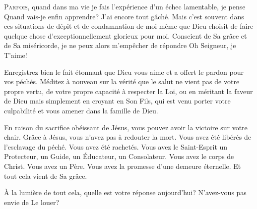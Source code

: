 



\lettrine{P}{arfois}, quand dans ma vie je fais l'expérience
 d'un échec lamentable, je pense\frcolon{} 
 \Og Quand vais-je enfin apprendre? J'ai encore tout gâché. \Fg{}
 Mais c'est souvent dans ces situations de dépit et de condamnation
 de moi-même que Dieu choisit de faire quelque chose d'exceptionnellement
 glorieux pour moi. Conscient de Sa grâce et de Sa miséricorde,
 je ne peux alors m'empêcher de répondre\frcolon{} 
 \Og Oh Seigneur, je T'aime! \Fg{}


Enregistrez bien le fait étonnant que Dieu vous aime et a offert
 le pardon pour vos péchés. Méditez à nouveau sur la vérité
 que le salut ne vient pas de votre propre vertu,
 de votre propre capacité à respecter la Loi,
 ou en méritant la faveur de Dieu mais simplement en croyant en Son Fils,
 qui est venu porter votre culpabilité et vous amener dans la famille de Dieu.

En raison du sacrifice obéissant de Jésus, vous pouvez avoir la victoire
 sur votre chair. Grâce à Jésus, vous n'avez pas à redouter la mort.
 Vous avez été libérés de l'esclavage du péché. Vous avez été rachetés.
 Vous avez le Saint-Esprit \ocadr un Protecteur, un Guide, un Éducateur,
 un Consolateur. Vous avez le corps de Christ. Vous avez un Père.
 Vous avez la promesse d'une demeure éternelle.
 Et tout cela vient de Sa grâce.

À la lumière de tout cela, quelle est votre réponse aujourd'hui?
 N'avez-vous pas envie de Le louer?

\dvrule



